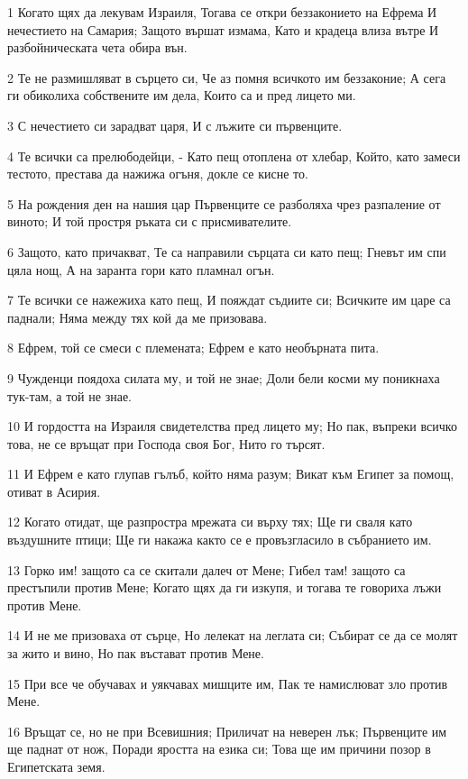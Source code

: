 \par 1 Когато щях да лекувам Израиля, Тогава се откри беззаконието на Ефрема И нечестието на Самария; Защото вършат измама, Като и крадеца влиза вътре И разбойническата чета обира вън.
\par 2 Те не размишляват в сърцето си, Че аз помня всичкото им беззаконие; А сега ги обиколиха собствените им дела, Които са и пред лицето ми.
\par 3 С нечестието си зарадват царя, И с лъжите си първенците.
\par 4 Те всички са прелюбодейци, - Като пещ отоплена от хлебар, Който, като замеси тестото, престава да нажижа огъня, докле се кисне то.
\par 5 На рождения ден на нашия цар Първенците се разболяха чрез разпаление от виното; И той простря ръката си с присмивателите.
\par 6 Защото, като причакват, Те са направили сърцата си като пещ; Гневът им спи цяла нощ, А на заранта гори като пламнал огън.
\par 7 Те всички се нажежиха като пещ, И пояждат съдиите си; Всичките им царе са паднали; Няма между тях кой да ме призовава.
\par 8 Ефрем, той се смеси с племената; Ефрем е като необърната пита.
\par 9 Чужденци поядоха силата му, и той не знае; Доли бели косми му поникнаха тук-там, а той не знае.
\par 10 И гордостта на Израиля свидетелства пред лицето му; Но пак, въпреки всичко това, не се връщат при Господа своя Бог, Нито го търсят.
\par 11 И Ефрем е като глупав гълъб, който няма разум; Викат към Египет за помощ, отиват в Асирия.
\par 12 Когато отидат, ще разпростра мрежата си върху тях; Ще ги сваля като въздушните птици; Ще ги накажа както се е провъзгласило в събранието им.
\par 13 Горко им! защото са се скитали далеч от Мене; Гибел там! защото са престъпили против Мене; Когато щях да ги изкупя, и тогава те говориха лъжи против Мене.
\par 14 И не ме призоваха от сърце, Но лелекат на леглата си; Събират се да се молят за жито и вино, Но пак въстават против Мене.
\par 15 При все че обучавах и  уякчавах мишците им, Пак те намислюват зло против Мене.
\par 16 Връщат се, но не при Всевишния; Приличат на неверен лък; Първенците им ще паднат от нож, Поради яростта на езика си; Това ще им причини позор в Египетската земя.

